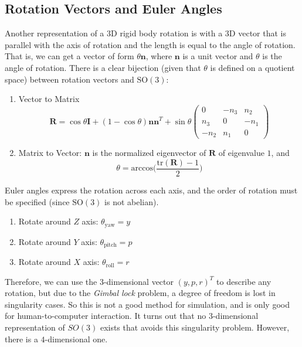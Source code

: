 \documentclass{article}
\begin{document}
  \subsection{Rotation Vectors and Euler Angles}
  Another representation of a 3D rigid body rotation is with a 3D vector that is parallel with the axis of rotation and the length is equal to the angle of rotation. That is, we can get a vector of form $\theta \mathbf{n}$, where $\mathbf{n}$ is a unit vector and $\theta$ is the angle of rotation. There is a clear bijection (given that $\theta$ is defined on a quotient space) between rotation vectors and $\mathrm{SO}(3)$: 
  \begin{enumerate}
      \item Vector to Matrix
      \begin{equation}
        \mathbf{R} = \cos{\theta} \mathbf{I} + (1 - \cos{\theta}) \mathbf{n} \mathbf{n}^T + \sin{\theta} \begin{pmatrix} 0 & -n_3 & n_2 \\ n_3 & 0 & -n_1 \\ -n_2 & n_1 & 0 \end{pmatrix}
      \end{equation}
      \item Matrix to Vector: $\mathbf{n}$ is the normalized eigenvector of $\mathbf{R}$ of eigenvalue $1$, and 
      \begin{equation}
        \theta = \mathrm{arccos}\bigg( \frac{\mathrm{tr}(\mathbf{R}) - 1}{2} \bigg)
      \end{equation}
  \end{enumerate}

  Euler angles express the rotation across each axis, and the order of rotation must be specified (since $\mathrm{SO}(3)$ is not abelian).  
  \begin{enumerate}
      \item Rotate around $Z$ axis: $\theta_{\mathrm{yaw}} = y$ 
      \item Rotate around $Y$ axis: $\theta_{\mathrm{pitch}} = p$ 
      \item Rotate around $X$ axis: $\theta_{\mathrm{roll}} = r$
  \end{enumerate}
  Therefore, we can use the 3-dimensional vector $(y, p, r)^T$ to describe any rotation, but due to the \textit{Gimbal lock} problem, a degree of freedom is lost in singularity cases. So this is not a good method for simulation, and is only good for human-to-computer interaction. It turns out that no $3$-dimensional representation of $SO(3)$ exists that avoids this singularity problem. However, there is a $4$-dimensional one. 
\end{document}
